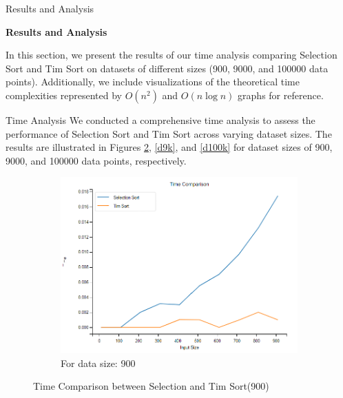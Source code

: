 \documentclass[aspectratio=169]{beamer}
\begin{document}
    \begin{frame}{Results and Analysis}
    
    
    \textbf{\fontsize{14}{16}\selectfont Results and Analysis}\newline

    In this section, we present the results of our time analysis comparing Selection Sort and Tim Sort on datasets of different sizes (900, 9000, and 100000 data points). Additionally, we include visualizations of the theoretical time complexities represented by \(O(n^2)\) and \(O(n \log n)\) graphs for reference.\\
  \end{frame}

  \begin{frame}{Time Analysis}
      We conducted a comprehensive time analysis to assess the performance of Selection Sort and Tim Sort across varying dataset sizes. The results are illustrated in Figures \ref{d900}, \ref{d9k}, and \ref{d100k} for dataset sizes of 900, 9000, and 100000 data points, respectively.
      \begin{figure}
	\centering
	\begin{subfigure}{\textwidth}
		\includegraphics[scale=0.25]{Images/900_time_comp.png}
		\caption{For data size: 900}
		\label{d900}
	\end{subfigure}
	\caption{Time Comparison between Selection and Tim Sort(900)}
        \end{figure}
  \end{frame}
\end{document}
